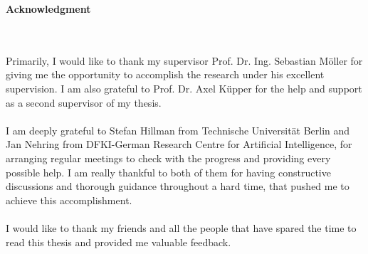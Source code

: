 \thispagestyle{empty}
\vspace*{3cm}

\begin{center}
\textbf{Acknowledgment}
\end{center}

\vspace*{0.5cm}
\\~\\
Primarily, I would like to thank my supervisor Prof. Dr. Ing. Sebastian Möller for giving me the opportunity to accomplish the research under his excellent supervision. I am also grateful to Prof. Dr. Axel Küpper for the help and support as a second supervisor of my thesis.
\\~\\
I am deeply grateful to Stefan Hillman from Technische Universität Berlin and Jan Nehring from DFKI-German Research Centre for Artificial Intelligence, for arranging regular meetings to check with the progress and providing every possible help. I am really thankful to both of them for having constructive discussions and thorough guidance throughout a hard time, that pushed me to achieve this accomplishment.
\\~\\
I would like to thank my friends and all the people that have spared the time to read this thesis and provided me valuable feedback.
